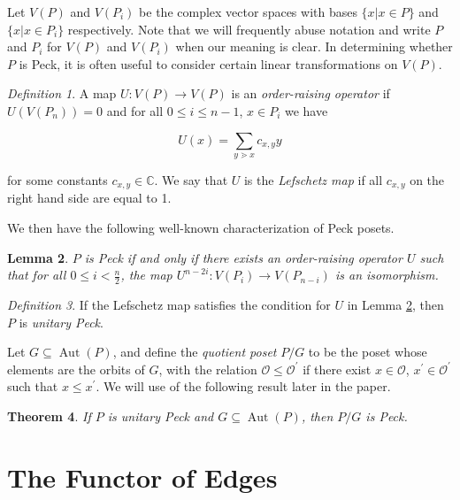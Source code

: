 \documentclass{amsart}
\newtheorem{thm}{Theorem}[subsection]
\newtheorem{lem}[thm]{Lemma}
\theoremstyle{remark}
\newtheorem{defn}[thm]{Definition}
\begin{document}
Let $V(P)$ and $V(P_i)$ be the complex vector spaces with bases $\{x |x\in P\}$ and $\{x |x\in P_i\}$ respectively.  Note that we will frequently abuse notation and write $P$ and $P_i$ for $V(P)$ and $V(P_i)$ when our meaning is clear.  In determining whether $P$ is Peck, it is often useful to consider certain linear transformations on $V(P)$.

\begin{defn}
A map $U\colon V(P)\rightarrow V(P)$ is an \textit{order-raising operator} if $U(V(P_n)) = 0$ and for all $0\le i\le n-1$, $x\in P_i$ we have

$$U(x) = \sum_{y\gtrdot x} c_{x,y}y$$

\noindent for some constants $c_{x,y}\in \mathbb{C}$.  We say that $U$ is the \textit{Lefschetz map} if all $c_{x,y}$ on the right hand side are equal to 1.
\end{defn}

\noindent We then have the following well-known characterization of Peck posets.

\begin{lem}\label{lem:Peck_poset_characterization}
$P$ is Peck if and only if there exists an order-raising operator $U$ such that for all $0\le i < \frac{n}{2}$, the map $U^{n-2i}\colon V(P_i)\rightarrow V(P_{n-i})$ is an isomorphism.
\end{lem}

\begin{defn}
If the Lefschetz map satisfies the condition for $U$ in Lemma \ref{lem:Peck_poset_characterization}, then $P$ is \textit{unitary Peck}.
\end{defn}


Let $G\subseteq \operatorname{Aut}(P)$, and define the \textit{quotient poset} $P/G$ to be the poset whose elements are the orbits of $G$, with the relation $\mathcal{O}\le \mathcal{O}^\prime$ if there exist $x\in \mathcal{O}$, $x^\prime\in \mathcal{O}^\prime$ such that $x\le x^\prime$.  We will use of the following result later in the paper.

\begin{thm}
\label{thm:quotients_of_unitary_peck_posets}
If $P$ is unitary Peck and $G\subseteq\operatorname{Aut}(P)$, then $P/G$ is Peck.
\end{thm}



\section{The Functor of Edges}
\label{sec:functor_of_edges}
\end{document}

